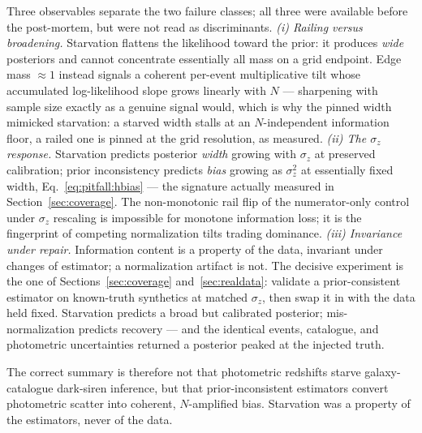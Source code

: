 Three observables separate the two failure classes; all three were available before the post-mortem, but were not read as discriminants.
\textit{(i) Railing versus broadening.} Starvation flattens the likelihood toward the prior: it produces \emph{wide} posteriors and cannot concentrate essentially all mass on a grid endpoint. Edge mass $\approx 1$ instead signals a coherent per-event multiplicative tilt whose accumulated log-likelihood slope grows linearly with $N$ --- sharpening with sample size exactly as a genuine signal would, which is why the pinned width mimicked starvation: a starved width stalls at an $N$-independent information floor, a railed one is pinned at the grid resolution, as measured.
\textit{(ii) The $\sigma_z$ response.} Starvation predicts posterior \emph{width} growing with $\sigma_z$ at preserved calibration; prior inconsistency predicts \emph{bias} growing as $\sigma_z^{2}$ at essentially fixed width, Eq.~\eqref{eq:pitfall:hbias} --- the signature actually measured in Section~\ref{sec:coverage}. The non-monotonic rail flip of the numerator-only control under $\sigma_z$ rescaling is impossible for monotone information loss; it is the fingerprint of competing normalization tilts trading dominance.
\textit{(iii) Invariance under repair.} Information content is a property of the data, invariant under changes of estimator; a normalization artifact is not. The decisive experiment is the one of Sections~\ref{sec:coverage} and~\ref{sec:realdata}: validate a prior-consistent estimator on known-truth synthetics at matched $\sigma_z$, then swap it in with the data held fixed. Starvation predicts a broad but calibrated posterior; mis-normalization predicts recovery --- and the identical events, catalogue, and photometric uncertainties returned a posterior peaked at the injected truth.

The correct summary is therefore not that photometric redshifts starve galaxy-catalogue dark-siren inference, but that prior-inconsistent estimators convert photometric scatter into coherent, $N$-amplified bias. Starvation was a property of the estimators, never of the data.

